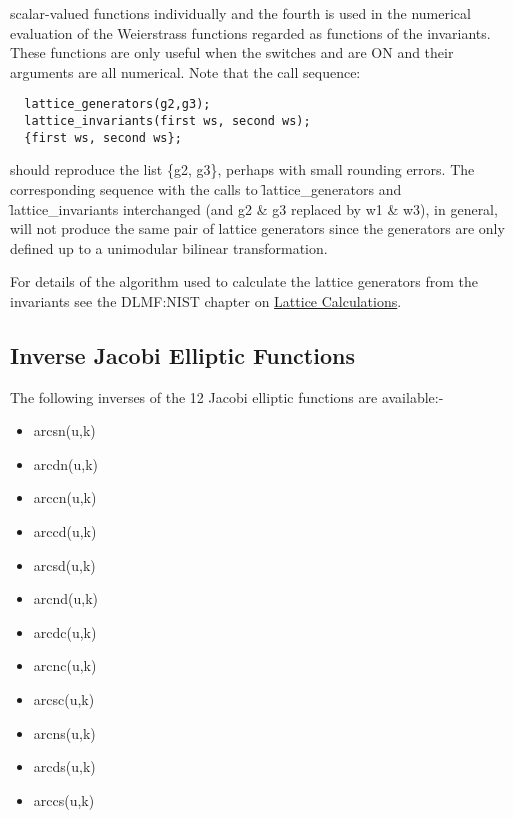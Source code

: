 scalar-valued functions individually and the fourth is used in the numerical
evaluation of the Weierstrass functions regarded as functions of the
invariants. These functions are only useful when the switches  and
 are ON and their arguments are all numerical.
Note that the call sequence:
\begin{verbatim}
  lattice_generators(g2,g3);
  lattice_invariants(first ws, second ws);
  {first ws, second ws};
\end{verbatim}
should reproduce the list \{g2, g3\}, perhaps with small rounding errors. The
corresponding sequence with the calls to \f{lattice\_generators} and
\f{lattice\_invariants} interchanged (and g2 \& g3 replaced by w1 \& w3),
in general, will not produce the same pair of lattice generators since the
generators are only defined up to a unimodular bilinear transformation.

For details of the algorithm used to calculate the lattice generators from the
invariants see the DLMF:NIST chapter on
\href{https://dlmf.nist.gov/23.22#ii}{Lattice Calculations}.

\subsection{Inverse Jacobi Elliptic Functions}
The following inverses of the 12 Jacobi elliptic functions are available:-
\hypertarget{INVELL}{}
\hypertarget{operator:ARCSN}{}
\hypertarget{operator:ARCCN}{}
\hypertarget{operator:ARCDN}{}
\hypertarget{operator:ARCCD}{}
\hypertarget{operator:ARCSD}{}
\hypertarget{operator:ARCND}{}
\hypertarget{operator:ARCDC}{}
\hypertarget{operator:ARCNC}{}
\hypertarget{operator:ARCSC}{}
\hypertarget{operator:ARCNS}{}
\hypertarget{operator:ARCDS}{}
\hypertarget{operator:ARCCS}{}
\begin{itemize}
\item arcsn(u,k)
\item arcdn(u,k)
\item arccn(u,k)
\item arccd(u,k)
\item arcsd(u,k)
\item arcnd(u,k)
\item arcdc(u,k)
\item arcnc(u,k)
\item arcsc(u,k)
\item arcns(u,k)
\item arcds(u,k)
\item arccs(u,k)
\end{itemize}

